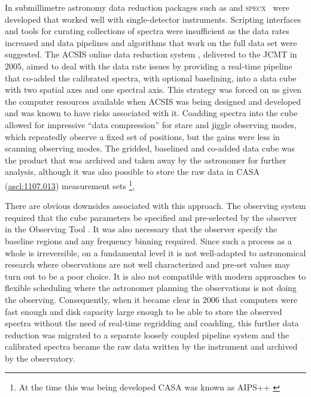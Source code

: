 \documentclass[useAMS,usenatbib]{mn2e}
\newcommand{\specx}{\textsc{specx}}
\newcommand{\ascl}[1]{\href{http://www.ascl.net/#1}{ascl:#1}}
\begin{document}
In submillimetre astronomy data reduction packages such as
\citep[][\ascl{1305.010}]{2005sf2a.conf..721P} and
\specx\ \citep[][\ascl{1310.008}]{SPECX,1990JCMTP...9...25P} were developed that worked well with
single-detector instruments. Scripting interfaces and tools for
curating collections of spectra were insufficient as the data rates
increased and data pipelines \citep[e.g.,][]{1995ASPC...75..117W} and
algorithms that work on the full data set
\citep[e.g.,][]{2002ASPC..278..329M} were suggested. The ACSIS online data
reduction system \citep{2000ASPC..216..502L,2000SPIE.4015..114H},
delivered to the JCMT in 2005, aimed to deal with the data rate issues
by providing a real-time pipeline that co-added the calibrated
spectra, with optional baselining, into a data cube with two spatial axes and one spectral axis.  This strategy
was forced on us given the computer resources available when ACSIS was
being designed and developed and was known to have risks associated
with it. Coadding spectra into the cube allowed for impressive ``data
compression'' for stare and jiggle observing modes, which repeatedly
observe a fixed set of positions, but the gains were less in scanning
observing modes.
The gridded, baselined and co-added data cube was the product that was archived
and taken away by the astronomer for further analysis, although it was
also possible to store the raw data in CASA (\ascl{1107.013}) measurement sets
\citep{2012ASPC..461..849P}\footnote{At the time this was being
developed CASA was known as AIPS++ \citep{2004ASPC..314..468M}},

There are obvious downsides associated with this approach. The
observing system required that the cube parameters be specified and
pre-selected by the observer in the Observing Tool
\citep{2002ASPC..281..453F}. It was also
necessary that the observer specify the baseline regions and any
frequency binning required. Since such a process as a whole is
irreversible, on a fundamental level it is not well-adapted to
astronomical research where observations are not well characterized
and pre-set values may turn out to be a poor choice. It is also not
compatible with modern approaches to flexible scheduling
\citep{2002ASPC..281..488E} where the astronomer planning the
observations is not doing the observing. Consequently,
when it became clear in 2006 that computers were fast enough and disk capacity
large enough to be able to store the observed spectra without the need
of real-time regridding and coadding, this further data reduction was
migrated to a separate loosely coupled pipeline system and the calibrated
spectra became the raw data written by the instrument and archived by
the observatory.
\end{document}
